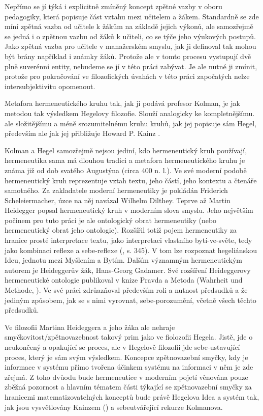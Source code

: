 \documentclass[11pt,a4paper]{article}
\begin{document}
Nepřímo se jí týká i explicitně zmíněný koncept zpětné vazby v oboru pedagogiky, která popisuje část vztahu mezi učitelem a žákem. Standardně se zde míní zpětná vazba od učitele k žákům na základě jejich výkonů, ale samozřejmě se jedná i o zpětnou vazbu od žáků k učiteli, co se týče jeho výukových postupů. Jako zpětná vazba pro učitele v manažerském smyslu, jak ji definoval \cite{ramaprasad_definition_1983} tak mohou být brány například i známky žáků. Protože ale v tomto procesu vystupují dvě plně suverénní entity, nebudeme se jí v této práci zabývat. Je ale nutné ji zmínit, protože pro pokračování ve filozofických úvahách v této práci započatých nelze intersubjektivitu opomenout.

Metafora hermeneutického kruhu tak, jak ji podává profesor Kolman, je jak metodou tak výsledkem Hegelovy filozofie. Slouží analogicky ke kompletnějšímu. ale složitějšímu a méně srozumitelnému kruhu kruhů, jak jej popisuje sám Hegel, především ale jak jej přibližuje Howard P. Kainz \cite*{kainz_paradox_1988}.

Kolman a Hegel samozřejmě nejsou jediní, kdo hermeneutický kruh používají, hermeneutika sama má dlouhou tradici a metafora hermeneutického kruhu je známa již od dob svatého Augustýna (circa 400 n. l.). Ve své moderní podobě hermeneutický kruh reprezentuje vztah textu, jeho částí, jeho kontextu a čtenáře samotného. Za zakladatele moderní hermeneutiky je pokládán Friderich Scheleiermacher, úzce na něj navázal Wilhelm Dilthey. Teprve až Martin Heidegger popsal hermeneutický kruh v moderním slova smyslu. Jeho největším počinem pro tuto práci je ale ontologický obrat hermeneutiky (nebo hermeneutický obrat jeho ontologie). Rozšířil totiž pojem hermeneutiky za hranice prosté interpretace textu, jako interpretaci vlastního bytí-ve-světe, tedy jako kombinaci reflexe a sebe-reflexe (\cite{stocker_palgrave_2018}, s. 345). V tom lze rozpoznat hegeliánskou Ideu, jednotu mezi Myšlením a Bytím. Dalším významným hermeneutickým autorem je Heideggerův žák, Hans-Georg Gadamer. Své rozšíření Heideggerovy hermeneutické ontologie publikoval v knize Pravda a Metoda (Wahrheit und Methode, \cite*{gadamer_wahrheit_1975}). Ve své práci zdrůazňoval především roli a nutnost předsudků a že jediným způsobem, jak se s nimi vyrovnat, sebe-porozumění, včetně všech těchto předsudků. 

Ve filozofii Martina Heideggera a jeho žáka ale nehraje smyčkovitost/zpětnovazebnost takový prim jako ve fiolozofii Hegela. Jistě, jde o neukončený a opakující se proces, ale v Hegelově filozofii jde sebe-ustavující proces, který je sám svým výsledkem. Koncepce zpětnovazební smyčky, kdy je informace v systému přímo tvořena účinkem systému na informaci v něm je zde zřejmá. Z toho dvůodu bude hermeneutice v moderním pojetí věnována pouze zběžná pozornost a hlavním tématem části týkající se zpětnovazební smyčky za hranicemi matematizovatelných konceptů bude právě Hegelova Idea a systém tak, jak jsou vysvětlovány Kainzem (\cite*{kainz_paradox_1988}) a sebeutvářející rekurze Kolmanova.
\end{document}
